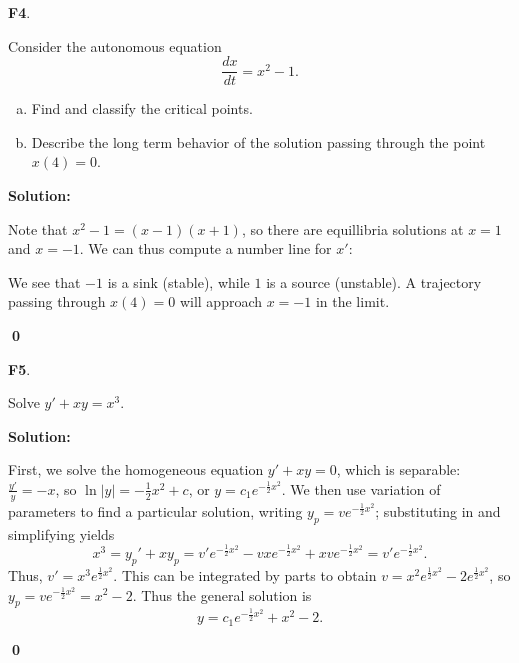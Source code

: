 \documentclass{article}
\newenvironment{problem}[1]
{
  \begin{flushleft}
  \textbf{#1}.
  \ignorespaces
}
{
  \end{flushleft}
}
\newenvironment{solution}
{
  \ignorespaces
  \textbf{Solution:}
}
{
  \ignorespacesafterend
  \begin{flushright}
  {\bfseries \qed}
  \end{flushright}
}
\begin{document}
\begin{problem}{F4}
Consider the autonomous equation 
\[\frac{dx}{dt} = x^2-1.\]  
\begin{enumerate}[(a)]
\item Find and classify the critical points.
\item Describe the long term behavior of the solution passing through the point \( x(4)=0 \).
\end{enumerate}
\end{problem}
\begin{solution}

Note that \(x^2-1=(x-1)(x+1)\), so there are equillibria solutions at \(x=1\) and \(x=-1\).  We can thus compute a number line for \(x'\):

\begin{center}
\end{center}

We see that \(-1\) is a sink (stable), while \(1\) is a source (unstable).  A trajectory passing through \(x(4)=0\) will approach \(x=-1\) in the limit.
\end{solution}

\begin{problem}{F5}
Solve \(y'+xy=x^3\).
\end{problem}
\begin{solution}
First, we solve the homogeneous equation \(y'+xy=0\), which is separable: \(\frac{y'}{y}=-x\), so \(\ln|y|=-\frac{1}{2}x^2+c\), or \(y=c_1e^{-\frac{1}{2}x^2}\). We then use variation of parameters to find a particular solution, writing \(y_p = v e^{-\frac{1}{2}x^2}\); substituting in and simplifying yields
\[x^3 = y_p ' +xy_p = v'e^{-\frac{1}{2}x^2} -vxe^{-\frac{1}{2}x^2} + xve^{-\frac{1}{2}x^2} = v'e^{-\frac{1}{2}x^2}.\]
Thus, \(v'=x^3 e^{\frac{1}{2}x^2} \).  This can be integrated by parts to obtain \(v=x^2e^{\frac{1}{2}x^2}-2e^{\frac{1}{2}x^2}\), so \(y_p = v e^{-\frac{1}{2}x^2} = x^2-2\).  Thus the general solution is
\[y=c_1e^{-\frac{1}{2}x^2} + x^2 - 2 .\]
\end{solution}
\end{document}
